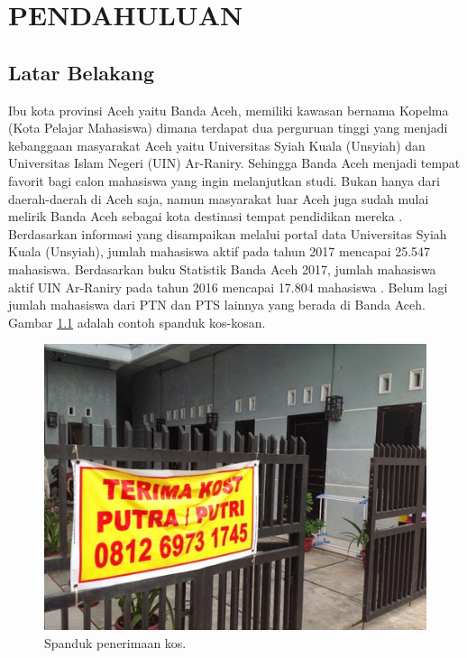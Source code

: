 
\chapter{PENDAHULUAN}

\section{Latar Belakang}
Ibu kota provinsi Aceh yaitu Banda Aceh, memiliki kawasan bernama Kopelma (Kota Pelajar Mahasiswa) dimana terdapat dua perguruan tinggi yang menjadi kebanggaan masyarakat Aceh yaitu Universitas Syiah Kuala (Unsyiah) dan Universitas Islam Negeri (UIN) Ar-Raniry. Sehingga Banda Aceh menjadi tempat favorit bagi calon mahasiswa yang ingin melanjutkan studi. Bukan hanya dari daerah-daerah di Aceh saja, namun masyarakat luar Aceh juga sudah mulai melirik Banda Aceh sebagai kota destinasi tempat pendidikan mereka \citep{abduh2016}. Berdasarkan informasi yang disampaikan melalui portal data Universitas Syiah Kuala (Unsyiah), jumlah mahasiswa aktif pada tahun 2017 mencapai 25.547 mahasiswa. Berdasarkan buku Statistik Banda Aceh 2017, jumlah mahasiswa aktif UIN Ar-Raniry pada tahun 2016 mencapai 17.804 mahasiswa \citep{bappeda2017}. Belum lagi jumlah mahasiswa dari PTN dan PTS lainnya yang berada di Banda Aceh. Gambar \ref{spandukkos} adalah contoh spanduk kos-kosan.
\begin{figure}[H]
	\centering
	\includegraphics[scale=0.5]{gambar/spandukkos}
	\caption{Spanduk penerimaan kos.}
	\label{spandukkos}
\end{figure}
